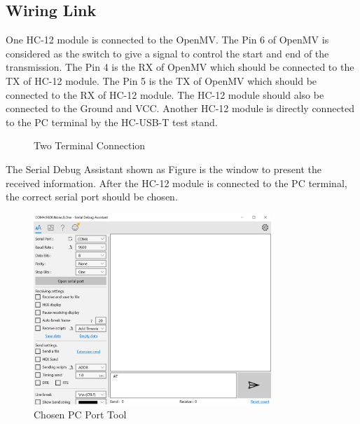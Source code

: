 \documentclass[12pt, a4paper, oneside]{report}
\begin{document}
	\subsection{Wiring Link}
	One HC-12 module is connected to the OpenMV. The Pin 6 of OpenMV is considered as the switch to give a signal to control the start and end of the transmission. The  Pin 4 is the RX of OpenMV which should be connected to the TX of HC-12 module. The Pin 5 is the TX of OpenMV which should be connected to the RX of HC-12 module. The HC-12 module should also be connected to the Ground and VCC. Another HC-12 module is directly connected to the PC terminal by the HC-USB-T test stand. 
	
	\begin{figure}[H]
  \centering
  \hspace{0.5cm}
  \caption{Two Terminal Connection}
  \label{fig:hc12-7-8}
\end{figure}

The Serial Debug Assistant shown as Figure is the window to present the received information. After the HC-12 module is connected to the PC terminal, the correct serial port should be chosen.  

\begin{figure}[H]
  \centering
  \includegraphics[width=0.8\textwidth]{pic/HC12/hc12-9.png}
  \caption{Chosen PC Port Tool}
  \label{fig:hc12-9}
\end{figure}
\end{document}
